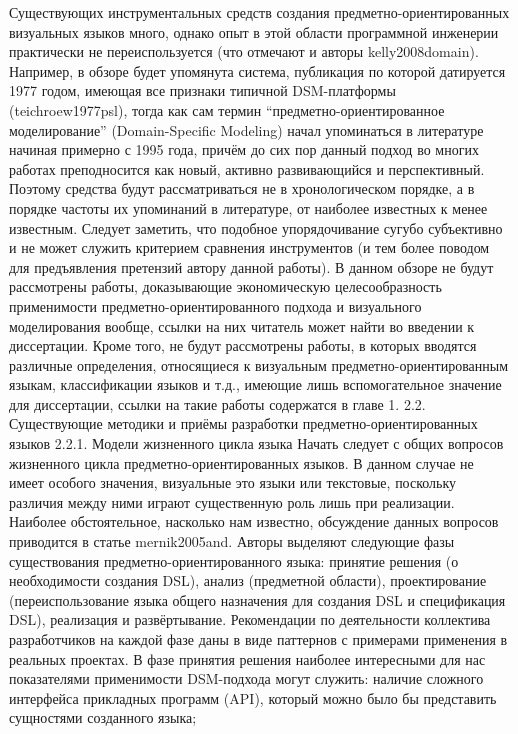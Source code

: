 	Существующих инструментальных средств создания предметно-ориентированных визуальных языков много, однако опыт в этой области программной инженерии практически не переиспользуется (что отмечают и авторы kelly2008domain). Например, в обзоре будет упомянута система, публикация по которой датируется 1977 годом, имеющая все признаки типичной DSM-платформы (teichroew1977psl), тогда как сам термин “предметно-ориентированное моделирование” (Domain-Specific Modeling) начал упоминаться в литературе начиная примерно с 1995 года, причём до сих пор данный подход во многих работах преподносится как новый, активно развивающийся и перспективный. Поэтому средства будут рассматриваться не в хронологическом порядке, а в порядке частоты их упоминаний в литературе, от наиболее известных к менее известным. Следует заметить, что подобное упорядочивание сугубо субъективно и не может служить критерием сравнения инструментов (и тем более поводом для предъявления претензий автору данной работы).
	В данном обзоре не будут рассмотрены работы, доказывающие экономическую целесообразность применимости предметно-ориентированного подхода и визуального моделирования вообще, ссылки на них читатель может найти во введении к диссертации. Кроме того, не будут рассмотрены работы, в которых вводятся различные определения, относящиеся к визуальным предметно-ориентированным языкам, классификации языков и т.д., имеющие лишь вспомогательное значение для диссертации, ссылки на такие работы содержатся в главе 1.
2.2. Существующие методики и приёмы разработки предметно-ориентированных языков
2.2.1. Модели жизненного цикла языка
	Начать следует с общих вопросов жизненного цикла предметно-ориентированных языков. В данном случае не имеет особого значения, визуальные это языки или текстовые, поскольку различия между ними играют существенную роль лишь при реализации. Наиболее обстоятельное, насколько нам известно, обсуждение данных вопросов приводится в статье mernik2005and. Авторы выделяют следующие фазы существования предметно-ориентированного языка: принятие решения (о необходимости создания DSL), анализ (предметной области), проектирование (переиспользование языка общего назначения для создания DSL и спецификация DSL), реализация и развёртывание. Рекомендации по деятельности коллектива разработчиков на каждой фазе даны в виде паттернов с примерами применения в реальных проектах. 
В фазе принятия решения наиболее интересными для нас показателями применимости DSM-подхода могут служить: 
наличие сложного интерфейса прикладных программ (API), который можно было бы представить сущностями созданного языка;
